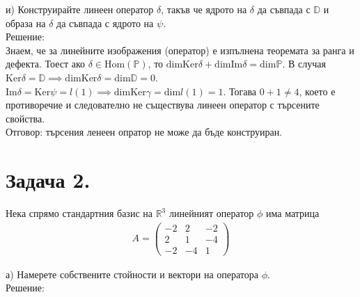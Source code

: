 \documentclass[12pt]{article}
\newcommand{\R}{\mathbb{R}}
\begin{document}
и) Конструирайте линеен оператор $\delta$, такъв че
ядрото на $\delta$ да съвпада с $\mathbb{D}$ и 
образа на $\delta$ да съвпада с ядрото на $\psi$. \\

Решение: \\

Знаем, че за линейните изображения (оператор) е изпълнена теоремата за
ранга и дефекта. Тоест ако $\delta \in \mathrm{Hom}(\mathbb{P})$, то
$\mathrm{dim}\mathrm{Ker}\delta + \mathrm{dim}\mathrm{Im}\delta = \mathrm{dim}\mathbb{P}$.
В случая $\mathrm{Ker}\delta = \mathbb{D} \implies \mathrm{dim}\mathrm{Ker}\delta = \mathrm{dim}\mathbb{D} = 0$.
$\mathrm{Im}\delta = \mathrm{Ker}\psi = l(1) \implies \mathrm{dim}\mathrm{Ker}\gamma = \mathrm{dim}l(1) = 1$.
Тогава $0 + 1 \neq 4$, което е противоречие и следователно не съществува линеен оператор с търсените свойства. \\

Отговор: търсения ленеен опратор не може да бъде конструиран.

\section*{Задача 2.}
Нека спрямо стандартния базис на $\R^3$ линейният оператор
$\phi$ има матрица
\begin{align*}
    A = \begin{pmatrix}
        -2 &  2 & -2 \\
         2 &  1 & -4 \\
        -2 & -4 &  1
    \end{pmatrix}
\end{align*}

а) Намерете собствените стойности и вектори на оператора $\phi$. \\

Решение: \\
\end{document}
